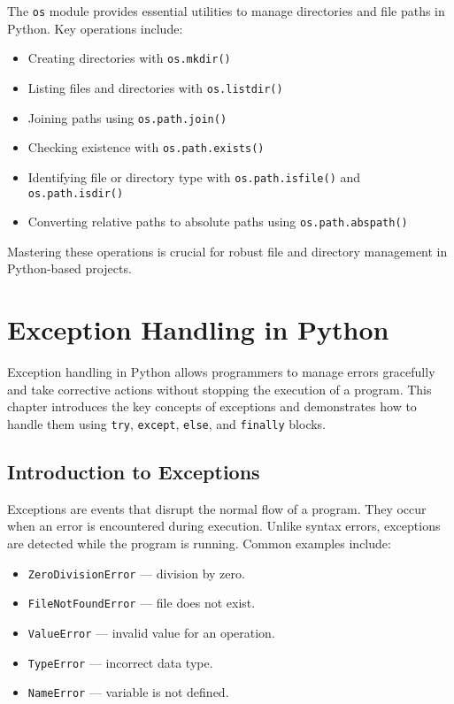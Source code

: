 The \texttt{os} module provides essential utilities to manage directories and file paths in Python. Key operations include:

\begin{itemize}
    \item Creating directories with \texttt{os.mkdir()}
    \item Listing files and directories with \texttt{os.listdir()}
    \item Joining paths using \texttt{os.path.join()}
    \item Checking existence with \texttt{os.path.exists()}
    \item Identifying file or directory type with \texttt{os.path.isfile()} and \texttt{os.path.isdir()}
    \item Converting relative paths to absolute paths using \texttt{os.path.abspath()}
\end{itemize}

Mastering these operations is crucial for robust file and directory management in Python-based projects.

\chapter{Exception Handling in Python}

Exception handling in Python allows programmers to manage errors gracefully and take corrective actions without stopping the execution of a program. This chapter introduces the key concepts of exceptions and demonstrates how to handle them using \texttt{try}, \texttt{except}, \texttt{else}, and \texttt{finally} blocks.

\section{Introduction to Exceptions}

Exceptions are events that disrupt the normal flow of a program. They occur when an error is encountered during execution. Unlike syntax errors, exceptions are detected while the program is running. Common examples include:

\begin{itemize}
    \item \texttt{ZeroDivisionError} — division by zero.
    \item \texttt{FileNotFoundError} — file does not exist.
    \item \texttt{ValueError} — invalid value for an operation.
    \item \texttt{TypeError} — incorrect data type.
    \item \texttt{NameError} — variable is not defined.
\end{itemize}

